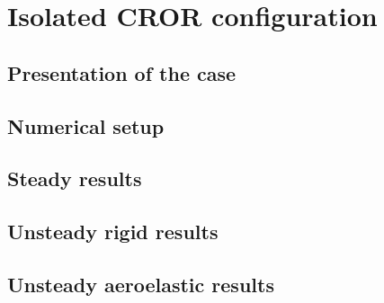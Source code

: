 \chapter{Isolated CROR configuration}
\label{cha:dream_isolated}

\chabstract{}

\minitoc
\newpage

\section{Presentation of the case}
\label{sec:dream_presentation}


\section{Numerical setup}
\label{sec:dream_numerical}


\section{Steady results}
\label{sec:dream_steady_results}


\section{Unsteady rigid results}
\label{sec:dream_unsteady_rigid_results}


\section{Unsteady aeroelastic results}
\label{sec:dream_unsteady_aeroelastic_results}


\chconclu{}
